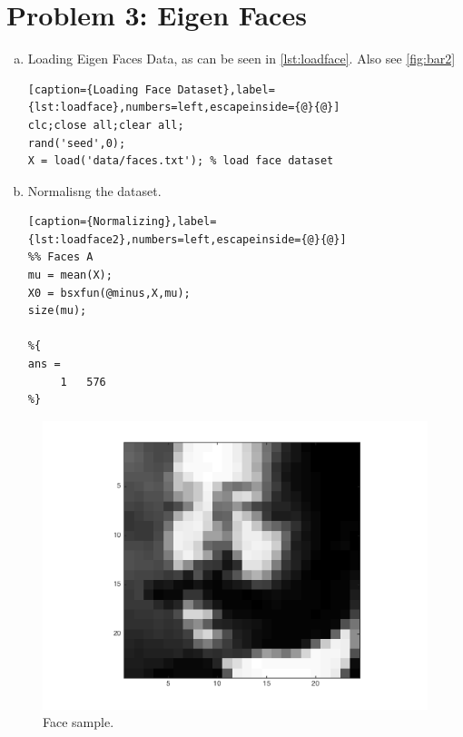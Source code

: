 \documentclass[a4paper, 11pt]{article}
\begin{document}
\section*{Problem 3: Eigen Faces}
\begin{enumerate}[(a)]
\item Loading Eigen Faces Data, as can be seen in \autoref{lst:loadface}. Also see \autoref{fig:bar2}%
\vspace{-20pt}
\begin{lstlisting}[caption={Loading Face Dataset},label={lst:loadface},numbers=left,escapeinside={@}{@}]
clc;close all;clear all;
rand('seed',0);
X = load('data/faces.txt'); % load face dataset
\end{lstlisting}

\item Normalisng the dataset.
\vspace{-20pt}
\begin{lstlisting}[caption={Normalizing},label={lst:loadface2},numbers=left,escapeinside={@}{@}]
%% Faces A
mu = mean(X);
X0 = bsxfun(@minus,X,mu);
size(mu);

%{
ans =
     1   576
%}
\end{lstlisting}

\end{enumerate}
\begin{figure}
\centering
\includegraphics[scale=0.7]{face.png}
\caption[]{Face sample.}
\label{fig:bar2}
\end{figure}

\end{document}
